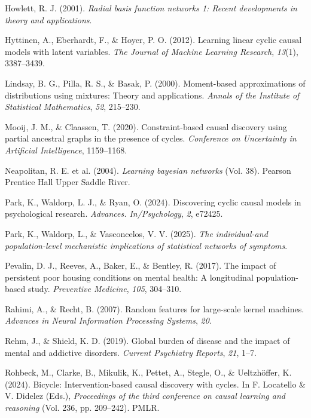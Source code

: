 \documentclass[
]{article}
\newlength{\cslhangindent}
\newenvironment{CSLReferences}[2] %
 {\begin{list}{}{%
  \setlength{\itemindent}{0pt}
  \setlength{\leftmargin}{0pt}
  \setlength{\parsep}{0pt}
  \ifodd #1
   \setlength{\leftmargin}{\cslhangindent}
   \setlength{\itemindent}{-1\cslhangindent}
  \fi
  \setlength{\itemsep}{#2\baselineskip}}}
 {\end{list}}
\begin{document}
\begin{CSLReferences}{1}{0}
Howlett, R. J. (2001). \emph{Radial basis function networks 1: Recent
developments in theory and applications}.

Hyttinen, A., Eberhardt, F., \& Hoyer, P. O. (2012). Learning linear
cyclic causal models with latent variables. \emph{The Journal of Machine
Learning Research}, \emph{13}(1), 3387--3439.

Lindsay, B. G., Pilla, R. S., \& Basak, P. (2000). Moment-based
approximations of distributions using mixtures: Theory and applications.
\emph{Annals of the Institute of Statistical Mathematics}, \emph{52},
215--230.

Mooij, J. M., \& Claassen, T. (2020). Constraint-based causal discovery
using partial ancestral graphs in the presence of cycles.
\emph{Conference on Uncertainty in Artificial Intelligence}, 1159--1168.

Neapolitan, R. E. et al. (2004). \emph{Learning bayesian networks} (Vol.
38). Pearson Prentice Hall Upper Saddle River.

Park, K., Waldorp, L. J., \& Ryan, O. (2024). Discovering cyclic causal
models in psychological research. \emph{Advances. In/Psychology},
\emph{2}, e72425.

Park, K., Waldorp, L., \& Vasconcelos, V. V. (2025). \emph{The
individual-and population-level mechanistic implications of statistical
networks of symptoms}.

Pevalin, D. J., Reeves, A., Baker, E., \& Bentley, R. (2017). The impact
of persistent poor housing conditions on mental health: A longitudinal
population-based study. \emph{Preventive Medicine}, \emph{105},
304--310.

Rahimi, A., \& Recht, B. (2007). Random features for large-scale kernel
machines. \emph{Advances in Neural Information Processing Systems},
\emph{20}.

Rehm, J., \& Shield, K. D. (2019). Global burden of disease and the
impact of mental and addictive disorders. \emph{Current Psychiatry
Reports}, \emph{21}, 1--7.

Rohbeck, M., Clarke, B., Mikulik, K., Pettet, A., Stegle, O., \&
Ueltzhöffer, K. (2024). Bicycle: Intervention-based causal discovery
with cycles. In F. Locatello \& V. Didelez (Eds.), \emph{Proceedings of
the third conference on causal learning and reasoning} (Vol. 236, pp.
209--242). PMLR.


\end{CSLReferences}
\end{document}
